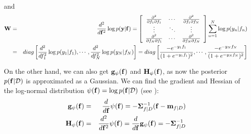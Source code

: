\documentclass{article}
\begin{document}
and
\begin{eqnarray}
  {\bf W}&=&\frac{d^2}{d{\bf f}^2}  \log p({\bf y}|{\bf f})
  =\left[\begin{array}{ccc}
      \frac{\partial^2}{\partial f_1\partial f_1}&\cdots
      &\frac{\partial^2}{\partial f_1\partial f_N}\\
      \vdots&\ddots&\vdots\\
      \frac{\partial^2}{\partial f_N\partial f_1}&\cdots
      &\frac{\partial^2}{\partial f_N\partial f_N}\\
    \end{array}\right]\sum_{n=1}^N\log p(y_n|f_n)
  \nonumber\\
  &=&diag \left[
    \frac{d^2}{df_1^2}\log p(y_1|f_1),\cdots,\frac{d^2}{df_N^2}\log p(y_N|f_N)
    \right]
  =diag \left[
    \frac{-e^{-y_1f_1}}{(1+e^{-y_1f_1})^2},\cdots,\frac{-e^{-y_Nf_N}}{(1+e^{-y_Nf_N})^2}
    \right]
  \label{BigW}
\end{eqnarray}


On the other hand, we can also get ${\bf g}_\psi({\bf f})$ and
${\bf H}_\psi({\bf f})$, as now the posterior $p({\bf f}|{\cal D})$ is 
approximated as a Gaussian. We can find the gradient and Hessian of 
the log-normal distribution $\psi({\bf f})=\log p({\bf f}|{\cal D})$ 
(see ):
\begin{eqnarray}
  {\bf g}_{\psi}({\bf f})&=&\frac{d}{d{\bf f}}\psi({\bf f})
  =-{\bf\Sigma}^{-1}_{f|D} ({\bf f}-{\bf m}_{f|D})
  \label{GradientPsi}\\
  {\bf H}_{\psi}({\bf f})&=&\frac{d^2}{d{\bf f}^2}\psi({\bf f})
  =\frac{d}{d{\bf f}}{\bf g}_{\psi}({\bf f})=-{\bf\Sigma}_{f|D}^{-1}
  \label{HessianPsi1}
\end{eqnarray}
\end{document}
